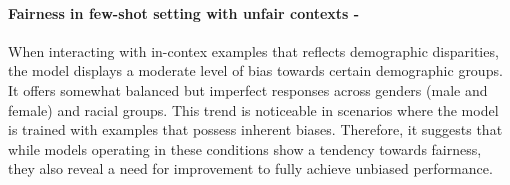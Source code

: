 \paragraph{Fairness in few-shot setting with unfair contexts - \mod}
When interacting with in-contex examples that reflects demographic disparities, the model displays a moderate level of bias towards certain demographic groups. It offers somewhat balanced but imperfect responses across genders (male and female) and racial groups. This trend is noticeable in scenarios where the model is trained with examples that possess inherent biases. Therefore, it suggests that while models operating in these conditions show a tendency towards fairness, they also reveal a need for improvement to fully achieve unbiased performance.